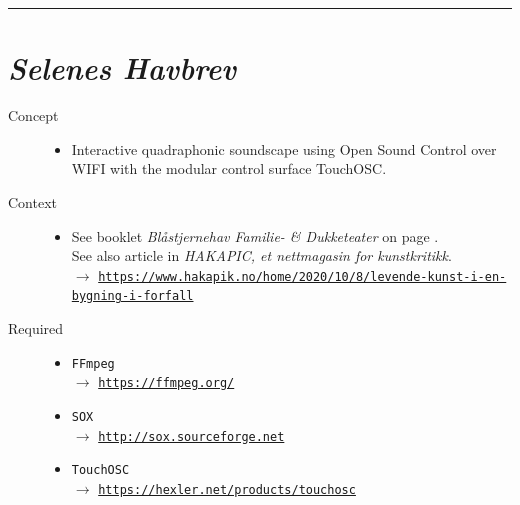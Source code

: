 \bigskip

\begin{center}\rule{0.5\linewidth}{0.5pt}\end{center}

\bigskip


\section*{\textsl{Selenes Havbrev}}


\bigskip

\begin{description}
\item[Concept] \hfill 
\begin{itemize}
\item[] Interactive quadraphonic soundscape using Open Sound Control over WIFI with the modular control surface TouchOSC.
\end{itemize}

\item[Context] \hfill 
\begin{itemize}
\item[] 
See booklet \textsl{Bl\aa stjernehav Familie- \& Dukketeater} on page \pageref{psh}.\\
See also article in \textsl{HAKAPIC, et nettmagasin for kunstkritikk}.\\
$\rightarrow$ \href{https://www.hakapik.no/home/2020/10/8/levende-kunst-i-en-bygning-i-forfall}{\texttt{\scriptsize https://www.hakapik.no/home/2020/10/8/levende-kunst-i-en-bygning-i-forfall}}

\end{itemize}

\item[Required] \hfill 
\begin{itemize}
\setlength\itemsep{1em}
\item[] \texttt{FFmpeg} \\ $\rightarrow$ \href{https://ffmpeg.org/}{\texttt{\small https://ffmpeg.org/}} %
\item[] \texttt{SOX} \\ $\rightarrow$ \href{http://sox.sourceforge.net/}{\texttt{\small http://sox.sourceforge.net}} %
\item[] \texttt{TouchOSC} \\ $\rightarrow$ \href{https://hexler.net/products/touchosc}{\texttt{\small https://hexler.net/products/touchosc}}
\end{itemize}


\end{description}
